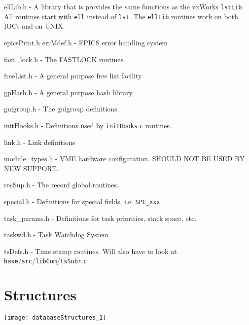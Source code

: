 ellLib.h - A library that is provides the same functions as the vxWorks \verb|lstLib|. All routines start with \verb|ell| instead of 
\verb|lst|.  The \verb|ellLib| routines work on both IOCs and on UNIX.

epicsPrint.h errMdef.h - EPICS error handling system

fast\_lock.h - The FASTLOCK routines.

freeList.h - A general purpose free list facility

gpHash.h - A general purpose hash library.

guigroup.h - The guigroup definitions.

initHooks.h - Definitions used by \verb|initHooks|.\verb|c| routines.

link.h - Link definitions

module\_types.h - VME hardware configuration. SHOULD NOT BE USED BY NEW SUPPORT.

recSup.h - The record global routines.

special.h - Definitions for special fields, i.e. \verb|SPC_xxx|.

task\_params.h - Definitions for task priorities, stack space, etc.

taskwd.h - Task Watchdog System

tsDefs.h - Time stamp routines. Will also have to look at \verb|base|/\verb|src|/\verb|libCom|/\verb|tsSubr|.\verb|c|

\section{Structures}



\texttt{[image: databaseStructures\_1]}








